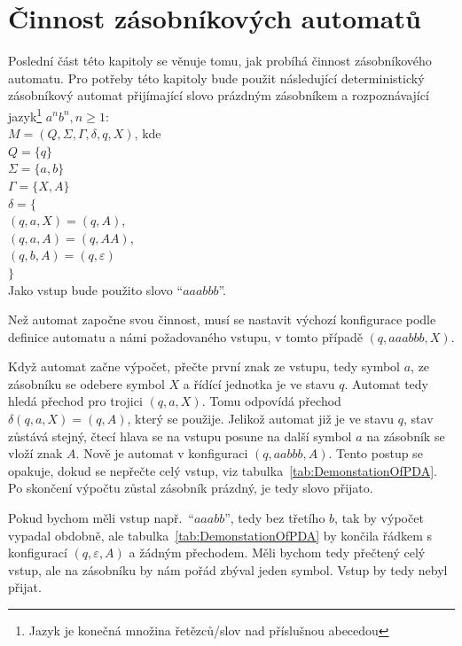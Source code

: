 \section{Činnost zásobníkových automatů}

Poslední část této kapitoly se věnuje tomu, jak probíhá činnost zásobníkového automatu. Pro potřeby této kapitoly bude použit následující deterministický zásobníkový automat přijímající slovo prázdným zásobníkem a rozpoznávající jazyk\footnote{Jazyk je konečná množina řetězců/slov nad příslušnou abecedou} $a^{n}b^{n}, n \ge 1$:\\
$M = (Q, \Sigma, \Gamma, \delta, q, X)$, kde \\
\indent$Q = \{q\}$\\
\indent$\Sigma = \{a,b\}$\\
\indent$\Gamma = \{X,A\}$\\
\indent$\delta = \{$\\
\indent\indent$(q,a,X) = (q,A)$,\\
\indent\indent$(q,a,A) = (q,AA)$,\\
\indent\indent$(q,b,A) = (q,\varepsilon)$\\
\indent$\}$\\
Jako vstup bude použito slovo ``$aaabbb$''.

Než automat započne svou činnost, musí se nastavit výchozí konfigurace podle definice automatu a námi požadovaného vstupu, v tomto případě $(q,aaabbb,X)$. 

Když automat začne výpočet, přečte první znak ze vstupu, tedy symbol $a$, ze zásobníku se odebere symbol $X$ a řídící jednotka je ve stavu $q$. Automat tedy hledá přechod pro trojici $(q,a,X)$. Tomu odpovídá přechod $\delta(q,a,X) = (q,A)$, který se použije. Jelikož automat již je ve stavu $q$, stav zůstává stejný, čtecí hlava se na vstupu posune na další symbol $a$ na zásobník se vloží znak $A$. Nově je automat v konfiguraci $(q,aabbb,A)$. Tento postup se opakuje, dokud se nepřečte celý vstup, viz tabulka~\ref{tab:DemonstationOfPDA}.~\cite{Kozen1997} Po skončení výpočtu zůstal zásobník prázdný, je tedy slovo přijato. 

Pokud bychom měli vstup např.\ ``$aaabb$'', tedy bez třetího $b$, tak by výpočet vypadal obdobně, ale tabulka~\ref{tab:DemonstationOfPDA} by končila řádkem s konfigurací $(q,\varepsilon,A)$ a žádným přechodem. Měli bychom tedy přečtený celý vstup, ale na zásobníku by nám pořád zbýval jeden symbol. Vstup by tedy nebyl přijat.

